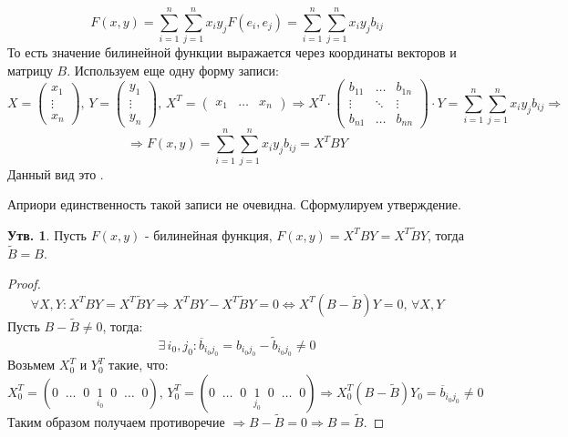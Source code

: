 \documentclass[12pt]{article}
\theoremstyle{definition}
\newtheorem{prop}{Утв.}
\newcommand{\wte}[1]{\widetilde{#1}}
\begin{document}
$$
	F(x,y) = \displaystyle \sum\limits_{i=1}^n \sum\limits_{j = 1}^n x_i y_j F(e_i, e_j) = \sum\limits_{i=1}^n \sum\limits_{j = 1}^n x_i y_j b_{ij}
$$
То есть значение билинейной функции выражается через координаты векторов и матрицу $B$. Используем еще одну форму записи:
$$
	X = 
	\begin{pmatrix}
		x_1 \\
		\vdots \\
		x_n
	\end{pmatrix}, \,
	Y = 
	\begin{pmatrix}
		y_1 \\
		\vdots \\
		y_n
	\end{pmatrix}, \, 
	X^T = 
	\begin{pmatrix}
		x_1 & \dotsc & x_n
	\end{pmatrix} \Rightarrow
	X^T{\cdot}
	\begin{pmatrix}
		b_{11} & \dotsc & b_{1n} \\
		\vdots & \ddots & \vdots \\
		b_{n1} & \dotsc & b_{nn}
	\end{pmatrix}{\cdot}
	Y= \sum\limits_{i=1}^n \sum\limits_{j = 1}^n x_i y_j b_{ij} \Rightarrow
$$
$$
	\Rightarrow F(x,y) = \sum\limits_{i=1}^n \sum\limits_{j = 1}^n x_i y_j b_{ij} = X^T B Y
$$
Данный вид это .

Априори единственность такой записи не очевидна. Сформулируем утверждение.
\begin{prop}
	Пусть $F(x,y)$ - билинейная функция, $F(x,y) = X^T B Y = X^T \wte{B} Y$, тогда $\wte{B} = B$.
\end{prop}
\begin{proof}
	$$
		\forall X,Y \colon X^T BY = X^T \wte{B} Y  \Rightarrow X^T B Y - X^T \wte{B} Y = 0 \Leftrightarrow X^T(B - \wte{B}) Y = 0, \, \forall X,Y
	$$ 
	Пусть $B - \wte{B} \neq 0$, тогда:
	$$
		\exists \, i_0, j_0 \colon \overline{b}_{i_0j_0} = b_{i_0 j_0} - \wte{b}_{i_0 j_0} \neq 0 
	$$
	Возьмем $X_0^T$ и $Y_0^T$ такие, что:
	$$
		X_0^T = 
			(0 \;\; \dotsc \;\; 0 \;\; \underset{i_0}{1} \;\; 0 \;\; \dotsc \;\;  0), \, Y_0^T = (0 \;\; \dotsc \;\; 0 \;\; \underset{j_0}{1} \;\; 0 \;\; \dotsc \;\;  0) \Rightarrow X_0^T (B - \wte{B})Y_0 = \overline{b}_{i_0 j_0} \neq 0
	$$
	Таким образом получаем противоречие $\Rightarrow B - \wte{B} = 0 \Rightarrow B = \wte{B}$.
\end{proof}
\end{document}
